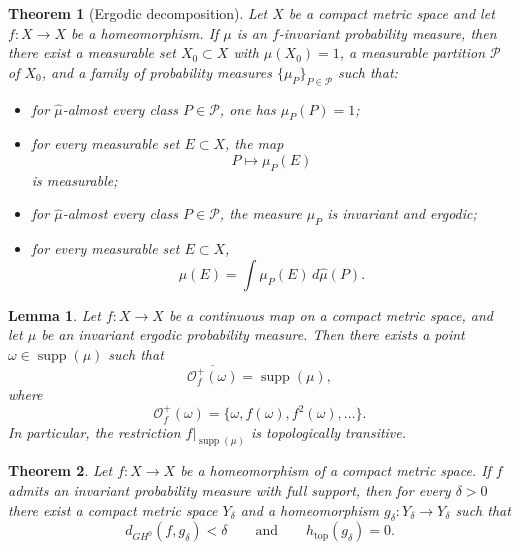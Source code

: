 \documentclass[10pt,a4paper]{amsart}
\newtheorem{lemma}{Lemma}
\newtheorem{theorem}{Theorem}
\DeclareMathOperator{\supp}{supp}
\DeclareMathOperator{\topo}{top}
\begin{document}
\begin{theorem}[Ergodic decomposition]\label{thm:ergodic_decomposition}
Let $X$ be a compact metric space and let $f:X\to X$ be a homeomorphism. If $\mu$ is an $f$-invariant probability measure, then there exist a measurable set $X_0\subset X$ with $\mu(X_0)=1$, a measurable partition $\mathcal P$ of $X_0$, and a family of probability measures $\{\mu_P\}_{P\in\mathcal P}$ such that:
\begin{itemize}
    \item[(i)] for $\hat{\mu}$-almost every class $P\in\mathcal P$, one has $\mu_P(P)=1$;
    \item[(ii)] for every measurable set $E\subset X$, the map
    \[
    P\mapsto \mu_P(E)
    \]
    is measurable;
    \item[(iii)] for $\hat{\mu}$-almost every class $P\in\mathcal P$, the measure $\mu_P$ is invariant and ergodic;
    \item[(iv)] for every measurable set $E\subset X$,
    \[
    \mu(E)=\int \mu_P(E)\,d\hat{\mu}(P).
    \]
\end{itemize}
\end{theorem}

\begin{lemma}\label{lem:dense_orbit_support}
Let $f:X\to X$ be a continuous map on a compact metric space, and let $\mu$ be an invariant ergodic probability measure. Then there exists a point $\omega \in \supp(\mu)$ such that
\[
\overline{\mathcal O_f^+(\omega)}=\supp(\mu),
\]
where
\[
\mathcal O_f^+(\omega)=\{\omega,f(\omega),f^2(\omega),\dots\}.
\]
In particular, the restriction $f|_{\supp(\mu)}$ is topologically transitive.
\end{lemma}

\begin{theorem}\label{thm:main}
Let $f:X\to X$ be a homeomorphism of a compact metric space. If $f$ admits an invariant probability measure with full support, then for every $\delta>0$ there exist a compact metric space $Y_\delta$ and a homeomorphism $g_\delta:Y_\delta\to Y_\delta$ such that
\[
d_{GH^0}(f,g_\delta)<\delta
\qquad\text{and}\qquad
h_{\topo}(g_\delta)=0.
\]
\end{theorem}
\end{document}
